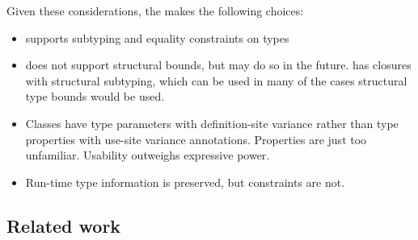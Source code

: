 Given these considerations, the \Xten makes the following choices:
\begin{itemize}
\item \Xten supports subtyping and equality constraints on types
\item \Xten does not support structural bounds, but may do so in
the future.  \Xten has closures with structural subtyping, which
can be used in many of the cases structural type bounds would be
used.
\item Classes have type parameters with definition-site variance
rather than type properties with use-site variance annotations.
Properties are just too unfamiliar.
Usability outweighs expressive power. 
\item Run-time type information is preserved, but constraints
are not.  
\end{itemize}


\subsection{Related work}
\label{sec:related}

